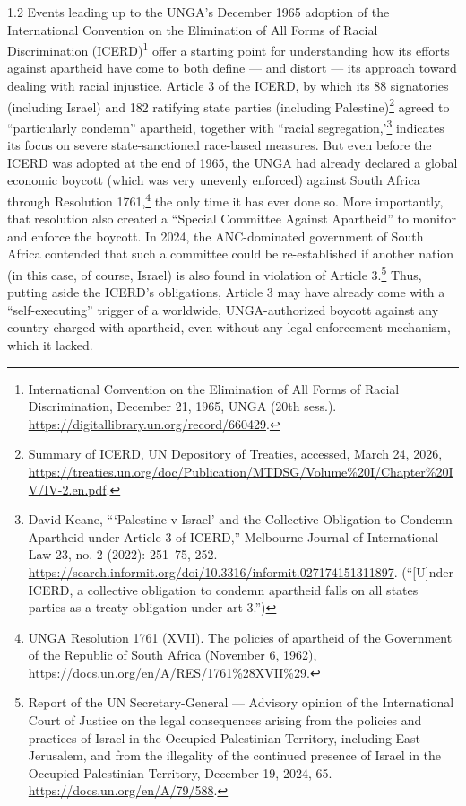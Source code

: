 \documentclass[../unravbook.tex]{subfiles}
\begin{document}
\begin{spacing}{1.2}
Events leading up to the UNGA's December 1965 adoption of the International Convention on the Elimination of All Forms of Racial Discrimination (ICERD)\footnote{International Convention on the Elimination of All Forms of Racial Discrimination, December 21, 1965, UNGA (20th sess.). \url{https://digitallibrary.un.org/record/660429}.} offer a starting point for understanding how its efforts against apartheid have come to both define --- and distort --- its approach toward dealing with racial injustice. Article 3 of the ICERD, by which its 88 signatories (including Israel) and 182 ratifying state parties (including Palestine)\footnote{Summary of ICERD, UN Depository of Treaties, accessed, March 24, 2026, \url{https://treaties.un.org/doc/Publication/MTDSG/Volume\%20I/Chapter\%20IV/IV-2.en.pdf}.} agreed to ``particularly condemn'' apartheid, together with ``racial segregation,'\footnote{David Keane, \enquote{\enquote{Palestine v Israel} and the Collective Obligation to Condemn Apartheid under Article 3 of ICERD,} Melbourne Journal of International Law 23, no. 2 (2022): 251--75, 252. \url{https://search.informit.org/doi/10.3316/informit.027174151311897}. (``[U]nder ICERD, a collective obligation to condemn apartheid falls on all states parties as a treaty obligation under art 3.'')} indicates its focus on severe state-sanctioned race-based measures. But even before the ICERD was adopted at the end of 1965, the UNGA had already declared a global economic boycott (which was very unevenly enforced) against South Africa through Resolution 1761,\footnote{UNGA Resolution 1761 (XVII). The policies of apartheid of the Government of the Republic of South Africa (November 6, 1962), \url{https://docs.un.org/en/A/RES/1761\%28XVII\%29}.} the only time it has ever done so. More importantly, that resolution also created a \enquote{Special Committee Against Apartheid} to monitor and enforce the boycott. In 2024, the ANC-dominated government of South Africa contended that such a committee could be re-established if another nation (in this case, of course, Israel) is also found in violation of Article 3.\footnote{Report of the UN Secretary-General --- Advisory opinion of the International Court of Justice on the legal consequences arising from the policies and practices of Israel in the Occupied Palestinian Territory, including East Jerusalem, and from the illegality of the continued presence of Israel in the Occupied Palestinian Territory, December 19, 2024, 65. \url{https://docs.un.org/en/A/79/588}.} Thus, putting aside the ICERD's obligations, Article 3 may have already come with a \enquote{self-executing} trigger of a worldwide, UNGA-authorized boycott against any country charged with apartheid, even without any legal enforcement mechanism, which it lacked.


\end{spacing}
\end{document}
